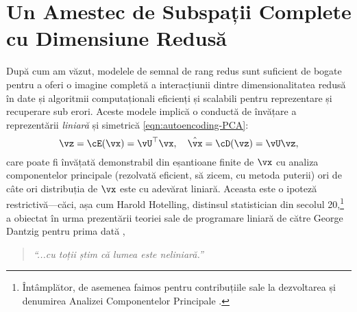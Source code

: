 \documentclass[../../book-main_ro.tex]{subfiles}
\begin{document}
\section{Un Amestec de Subspații Complete cu Dimensiune Redusă}%
\label{sec:ica}
După cum am văzut, modelele de semnal de rang redus sunt suficient de bogate pentru a oferi o imagine completă a interacțiunii dintre dimensionalitatea redusă în date și algoritmii computaționali eficienți și scalabili pentru reprezentare și recuperare sub erori.
Aceste modele implică o conductă de învățare a reprezentării \textit{liniară} și simetrică \eqref{eqn:autoencoding-PCA}:
\begin{equation*}
    \vz = \cE(\vx) = \vU^\top \vx, \quad \hat{\vx} = \cD(\vz) = \vU \vz,
\end{equation*}
care poate fi învățată demonstrabil din eșantioane finite de $\vx$ cu analiza componentelor principale (rezolvată eficient, să zicem, cu metoda puterii) ori de câte ori distribuția de $\vx$ este cu adevărat liniară.
Aceasta este o ipoteză restrictivă---căci, așa cum Harold Hotelling, distinsul statistician din secolul 20,\footnote{Întâmplător, de asemenea faimos pentru contribuțiile sale la dezvoltarea și denumirea Analizei Componentelor Principale \cite{Hotelling1933}.} a obiectat în urma prezentării teoriei sale de programare liniară de către George Dantzig pentru prima dată \cite{Dantzig2002-eh},
\begin{quote}
\centering
    \textit{``...cu toții știm că lumea este neliniară.''}
\end{quote}
\end{document}
